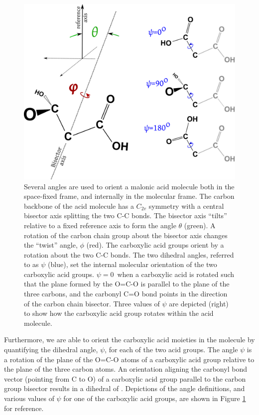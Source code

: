 \begin{figure}[h!]
	\begin{center}
		\includegraphics[scale=1.0]{images/orientation/malonic-angle-definitions.png}
		\caption{Several angles are used to orient a malonic acid molecule both in the space-fixed frame, and internally in the molecular frame. The carbon backbone of the acid molecule has a $C_{2v}$ symmetry with a central bisector axis splitting the two C-C bonds. The bisector axis ``tilts'' relative to a fixed reference axis to form the angle $\theta$ (green). A rotation of the carbon chain group about the bisector axis changes the ``twist'' angle, $\phi$ (red). The carboxylic acid groups orient by a rotation about the two C-C bonds. The two dihedral angles, referred to as $\psi$ (blue), set the internal molecular orientation of the two carboxylic acid groups. $\psi=0$\textdegree~when a carboxylic acid is rotated such that the plane formed by the O=C-O is parallel to the plane of the three carbons, and the carbonyl C=O bond points in the direction of the carbon chain bisector. Three values of $\psi$ are depicted (right) to show how the carboxylic acid group rotates within the acid molecule.}
		\label{fig:angle-definitions}
	\end{center}
\end{figure}


Furthermore, we are able to orient the carboxylic acid moieties in the molecule by quantifying the dihedral angle, $\psi$, for each of the two acid groups. The angle $\psi$ is a rotation of the plane of the O=C-O atoms of a carboxylic acid group relative to the plane of the three carbon atoms. An orientation aligning the carbonyl bond vector (pointing from C to O) of a carboxylic acid group parallel to the carbon group bisector results in a dihedral of \degr. Depictions of the angle definitions, and various values of $\psi$ for one of the carboxylic acid groups, are shown in Figure \ref{fig:angle-definitions} for reference.

